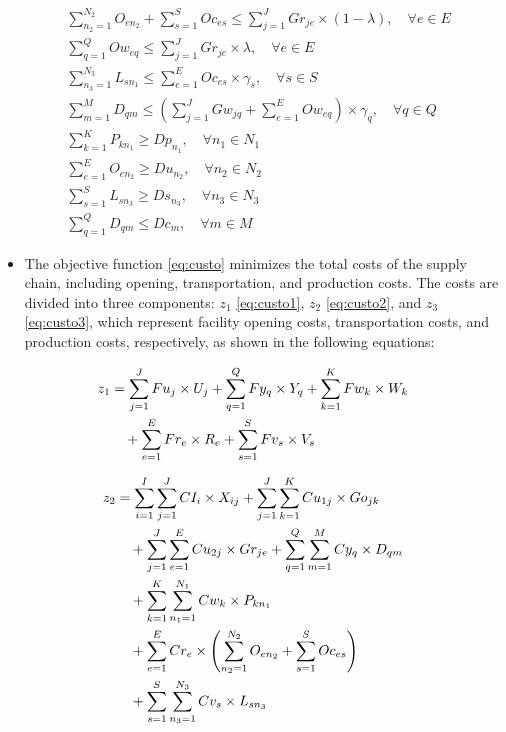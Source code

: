 \documentclass[preprint,12pt,authoryear]{elsarticle}
\begin{document}
\begin{align}
        & \sum\limits_{n_2=1}^{N_2} O_{en_2} + \sum\limits_{s=1}^S Oc_{es} \le \sum\limits_{j=1}^J Gr_{je}\times(1-\lambda), \quad \forall e\in E \label{eq:restricao13} \\
    & \sum\limits_{q=1}^{Q} Ow_{eq} \le \sum\limits_{j=1}^J Gr_{je} \times \lambda, \quad \forall e \in E \label{eq:restricao14} \\
    & \sum\limits_{n_3=1}^{N_3} L_{sn_1} \le \sum\limits_{e=1}^E Oc_{es} \times \gamma_s, \quad \forall s \in S \label{eq:restricao15} \\
    & \sum\limits_{m=1}^M D_{qm} \le \left(\sum\limits_{j=1}^J Gw_{jq} + \sum\limits_{e=1}^E Ow_{eq} \right) \times \gamma_q, \quad \forall q \in Q \label{eq:restricao16} \\
    & \sum\limits_{k=1}^K P_{kn_1} \ge Dp_{n_1}, \quad \forall n_1 \in N_1 \label{eq:restricao17}\\
    & \sum\limits_{e=1}^E O_{en_2} \ge Du_{n_2}, \quad \forall n_2 \in N_2 \label{eq:restricao18}\\
    & \sum\limits_{s=1}^S L_{sn_3} \ge Ds_{n_3}, \quad \forall n_3 \in N_3 \label{eq:restricao19}\\
    & \sum\limits_{q=1}^Q D_{qm} \le Dc_{m}, \quad \forall m \in M \label{eq:restricao20}
\end{align}
    
\begin{itemize}
\item The objective function \eqref{eq:custo} minimizes the total costs of the supply chain, including opening, transportation, and production costs. The costs are divided into three components: 
$z_1$ \eqref{eq:custo1}, $z_2$ \eqref{eq:custo2}, and $z_3$ \eqref{eq:custo3}, which represent facility opening costs, transportation costs, and production costs, respectively, as shown in the following equations:
\end{itemize}

\begin{align}
  z_1 &= \sum_{j=1}^J Fu_j \times U_j 
      + \sum_{q=1}^Q Fy_q \times Y_q 
      + \sum_{k=1}^{K} Fw_k \times W_k \notag \\
      &\quad + \sum_{e=1}^{E} Fr_e \times R_e
      + \sum_{s=1}^S Fv_s \times V_s
      \label{eq:custo1}
\end{align}

\begin{align}
  z_2 &= \sum_{i=1}^I\sum_{j=1}^J CI_i \times X_{ij} 
      + \sum_{j=1}^J\sum_{k=1}^K Cu_{1j} \times Go_{jk} \notag \\
      &\quad + \sum_{j=1}^J\sum_{e=1}^E Cu_{2j} \times Gr_{je} 
      + \sum_{q=1}^Q\sum_{m=1}^M Cy_q \times D_{qm} \notag \\
      &\quad + \sum_{k=1}^K\sum_{n_1=1}^{N_1} Cw_k \times P_{kn_1} \notag \\
      &\quad + \sum_{e=1}^E Cr_e \times \left( \sum_{n_2=1}^{N_2} O_{en_2} 
      + \sum_{s=1}^S Oc_{es} \right) \notag \\
      &\quad + \sum_{s=1}^S\sum_{n_3=1}^{N_3} Cv_s \times L_{sn_3}
      \label{eq:custo2}
\end{align}
\end{document}
